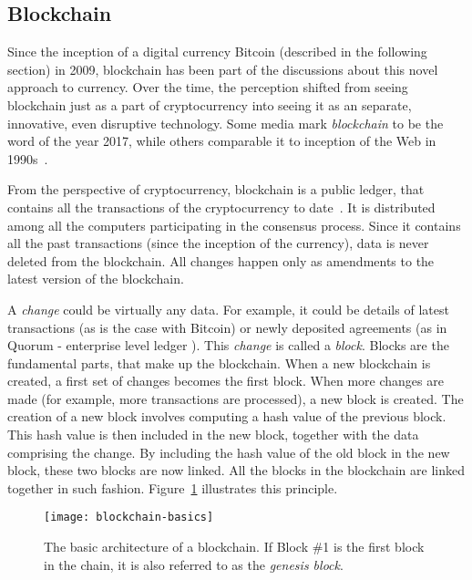 \subsection{Blockchain}
% 
Since the inception of a digital currency Bitcoin (described in the following section) in 2009, blockchain has been part of the discussions about this novel approach to currency. Over the time, the perception shifted from seeing blockchain just as a part of cryptocurrency into seeing it as an separate, innovative, even disruptive technology. Some media mark \textit{blockchain} to be the word of the year 2017\footnotemark, while others comparable it to inception of the Web in 1990s~\cite[p. 14]{Swan2015BlockchainEconomy}.
% 

From the perspective of cryptocurrency, blockchain is a public ledger, that contains all the transactions of the cryptocurrency to date~\cite{Swan2015BlockchainEconomy}. It is distributed among all the computers participating in the consensus process. Since it contains all the past transactions (since the inception of the currency), data is never deleted from the blockchain. All changes happen only as amendments to the latest version of the blockchain.

A \textit{change} could be virtually any data. For example, it could be details of latest transactions (as is the case with Bitcoin) or newly deposited agreements (as in Quorum - enterprise level ledger \footnotemark ). This \textit{change} is called a \textit{block}. Blocks are the fundamental parts, that make up the blockchain. When a new blockchain is created, a first set of changes becomes the first block.
% 
% 
When more changes are made (for example, more transactions are processed), a new block is created. The creation of a new block involves computing a hash value of the previous block. This hash value is then included in the new block, together with the data comprising the change. By including the hash value of the old block in the new block, these two blocks are now linked. All the blocks in the blockchain are linked together in such fashion. Figure~\ref{fig:blockch-basics} illustrates this principle. 
% 
\begin{figure}[h]
    \centering
    \texttt{[image: blockchain-basics]}
    \caption{The basic architecture of a blockchain. If Block \#1 is the first block in the chain, it is also referred to as the \textit{genesis block}.}
    \label{fig:blockch-basics}
\end{figure}


